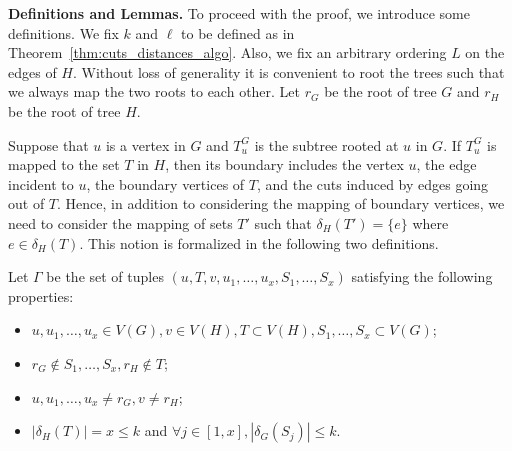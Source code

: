 \noindent \textbf{\large Definitions and Lemmas.} To proceed with the proof, we introduce some definitions. We fix $k$ and $\ell$ to be defined as in Theorem~\ref{thm:cuts_distances_algo}. Also, we fix an arbitrary ordering $L$ on the edges of $H$. Without loss of generality it is convenient to root the trees such that we always map the two roots to each other. Let $r_G$ be the root of tree $G$ and $r_H$ be the root of tree $H$.

Suppose that $u$ is a vertex in $G$ and $T^G_u$ is the subtree rooted at $u$ in $G$. If $T_u^G$ is mapped to the set $T$ in $H$, then its boundary includes the vertex $u$, the edge
incident to $u$, the boundary vertices of $T$, and the cuts induced by
edges going out of $T$. Hence, in addition to considering the mapping
of boundary vertices, we need to consider the mapping of sets $T'$
such that $\delta_H(T') = \{e\}$ where $e \in \delta_H(T)$. This
notion is formalized in the following two definitions. 

\begin{definition}\label{def:gamma}
  Let $\Gamma$ be the set of tuples
  $(u,T,v,u_1,\dots,u_x,S_1,\dots,S_x)$ satisfying the following
  properties:
  \begin{itemize}
  \item
    $u, u_1, \dots, u_x \in V(G), v \in V(H), T \subset V(H),
    S_1, \dots, S_x \subset V(G)$;
  \item $r_G \not \in S_1,\dots,S_x, r_H \not \in T$;
  \item $u,u_1,\dots,u_x \neq r_G, v \neq r_H$;
  \item $|\delta_H(T)| = x \leq k$ and
    $\forall j \in [1,x], |\delta_G(S_j)| \leq k $.
  \end{itemize}
\end{definition}

